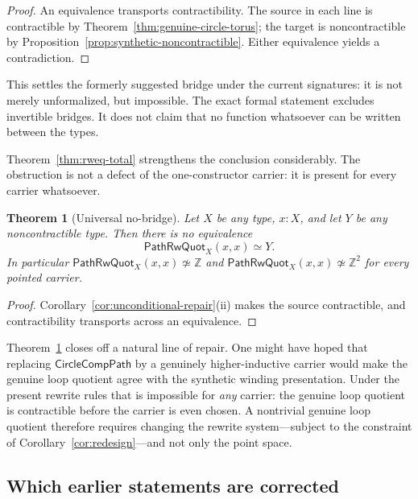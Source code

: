 \documentclass[10pt,reqno]{amsart}
\newtheorem{theorem}{Theorem}[section]
\newcommand{\Eqv}{\simeq}
\newcommand{\PRW}{\mathsf{PathRwQuot}}
\begin{document}
\begin{proof}
An equivalence transports contractibility.  The source in each line is
contractible by Theorem~\ref{thm:genuine-circle-torus}; the target is
noncontractible by Proposition~\ref{prop:synthetic-noncontractible}.  Either
equivalence yields a contradiction.
\end{proof}

This settles the formerly suggested bridge under the current signatures: it is
not merely unformalized, but impossible.  The exact formal statement excludes
invertible bridges.  It does not claim that no function whatsoever
can be written between the types.

Theorem~\ref{thm:rweq-total} strengthens the conclusion considerably.  The
obstruction is not a defect of the one-constructor carrier: it is present for
every carrier whatsoever.

\begin{theorem}[Universal no-bridge]
\label{thm:universal-no-bridge}
Let \(X\) be any type, \(x:X\), and let \(Y\) be any noncontractible type.  Then
there is no equivalence
\[
 \PRW_X(x,x)\Eqv Y .
\tag{13.5}\label{eq:universal-no-bridge}
\]
In particular \(\PRW_X(x,x)\not\Eqv\mathbb Z\) and
\(\PRW_X(x,x)\not\Eqv\mathbb Z^2\) for every pointed carrier.
\end{theorem}

\begin{proof}
Corollary~\ref{cor:unconditional-repair}(ii) makes the source contractible, and
contractibility transports across an equivalence.
\end{proof}

Theorem~\ref{thm:universal-no-bridge} closes off a natural line of repair.  One
might have hoped that replacing \(\mathsf{CircleCompPath}\) by a genuinely
higher-inductive carrier would make the genuine loop quotient agree with the
synthetic winding presentation.  Under the present rewrite rules that is
impossible for \emph{any} carrier: the genuine loop quotient is contractible
before the carrier is even chosen.  A nontrivial genuine loop quotient therefore
requires changing the rewrite system---subject to the constraint of
Corollary~\ref{cor:redesign}---and not only the point space.

\subsection{Which earlier statements are corrected}
\label{subsec:corrections}
\end{document}
